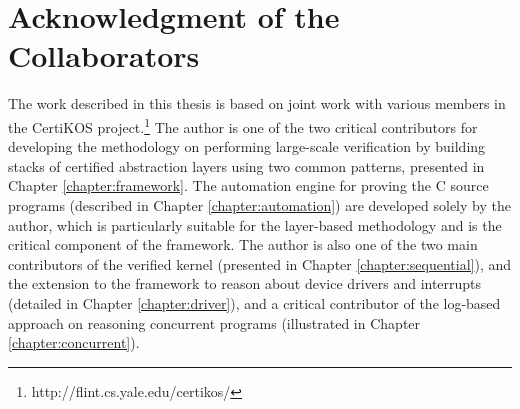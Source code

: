 \section{Acknowledgment of the Collaborators}

The work described in this thesis is based on joint work with various members
in the CertiKOS project.\footnote{http://flint.cs.yale.edu/certikos/}
The author is one of the two critical contributors for developing the methodology
on performing large-scale verification by building stacks of certified abstraction layers
using two common patterns, presented in Chapter \ref{chapter:framework}. The automation
engine for proving the C source programs (described in Chapter \ref{chapter:automation})
are developed solely by the author, which is particularly suitable for the
layer-based methodology and is the critical component of the framework. 
The author is also one of the two main contributors of the verified kernel (presented
in Chapter \ref{chapter:sequential}), and the
extension to the framework to reason about device drivers and interrupts
(detailed in Chapter \ref{chapter:driver}), and a critical contributor
of the log-based approach on reasoning
concurrent programs (illustrated in Chapter \ref{chapter:concurrent}). 



